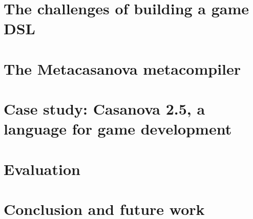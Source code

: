 \documentclass[lnicst]{svmultln}
\begin{document}
\section{The challenges of building a game DSL}
\label{sec:problem_statement}



\vspace{-0.6cm}
\section{The Metacasanova metacompiler}
\label{sec:formal_description}


\vspace{-0.6cm}
\section{Case study: Casanova 2.5, a language for game development}
\label{sec:casanova3}



\section{Evaluation}
\label{sec:evaluation}


\vspace{-1.2cm}
\section{Conclusion and future work}
\label{sec:future_works}



%
%


\vspace{-0.75cm}


%
\end{document}
